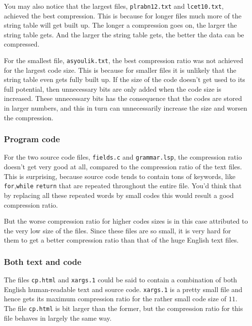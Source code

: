 You may also notice that the largest files, \verb|plrabn12.txt| and
\verb|lcet10.txt|, achieved the best compression. This is because for
longer files much more of the string table will get built up. The
longer a compression goes on, the larger the string table gets. And
the larger the string table gets, the better the data can be
compressed.

For the smallest file, \verb|asyoulik.txt|, the best compression ratio
was not achieved for the largest code size. This is because for
smaller files it is unlikely that the string table even gets fully
built up. If the size of the code doesn't get used to its full
potential, then unnecessary bits are only added when the code size is
increased. These unnecessary bits has the consequence that the codes
are stored in larger numbers, and this in turn can unnecessarily
increase the size and worsen the compression.

\subsubsection{Program code}

For the two source code files, \verb|fields.c| and \verb|grammar.lsp|,
the compression ratio doesn't get very good at all, compared to the
compression ratio of the text files. This is surprising, because
source code tends to contain tons of keywords, like
\verb|for|,\verb|while| \verb|return| that are repeated throughout the
entire file. You'd think that by replacing all these repeated words by
small codes this would result a good compression ratio.

But the worse compression ratio for higher codes sizes is in this case
attributed to the very low size of the files. Since these files are so
small, it is very hard for them to get a better compression ratio than
that of the huge English text files.

\subsubsection{Both text and code}

The files \verb|cp.html| and \verb|xargs.1| could be said to contain a
combination of both English human-readable text and source
code. \verb|xargs.1| is a pretty small file and hence gets its maximum
compression ratio for the rather small code size of $11$. The file
\verb|cp.html| is bit larger than the former, but the compression
ratio for this file behaves in largely the same way.

